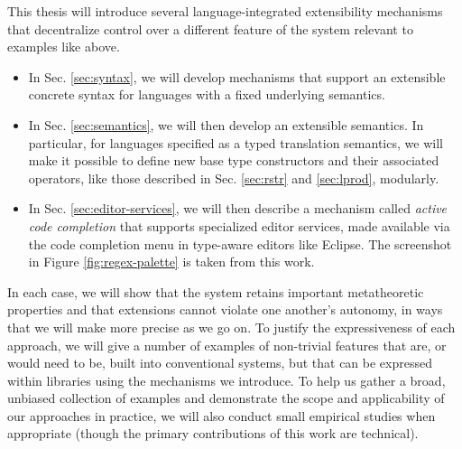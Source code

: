 

This thesis will introduce several language-integrated extensibility mechanisms that decentralize control over a different feature of the system relevant to examples like  above. 
\begin{itemize}
\item In Sec. \ref{sec:syntax}, we will develop mechanisms that support an extensible concrete syntax for languages with a fixed underlying semantics.
\item In Sec. \ref{sec:semantics}, we will then develop an extensible semantics. In particular, for languages specified as a typed translation semantics, we will make it possible to define new base type constructors and their associated operators, like those described in Sec. \ref{sec:rstr} and \ref{sec:lprod}, modularly.
\item In Sec. \ref{sec:editor-services}, we will then describe a mechanism called \emph{active code completion} that supports specialized editor services, made available via the code completion menu in type-aware editors like Eclipse. The screenshot in Figure \ref{fig:regex-palette} is taken from this work.
\end{itemize}

In each case, we will show that the system retains important metatheoretic properties and that extensions cannot violate one another's autonomy, in ways that we will make more precise as we go on. To justify the  expressiveness of each approach, we will give a number of examples of non-trivial features that are, or would need to be, built into conventional systems, but that can be expressed within libraries using the mechanisms we introduce. To help us gather a broad, unbiased collection of examples and demonstrate the scope and applicability of our approaches in practice, we will also conduct small empirical studies when appropriate (though the primary contributions of this work are technical).


